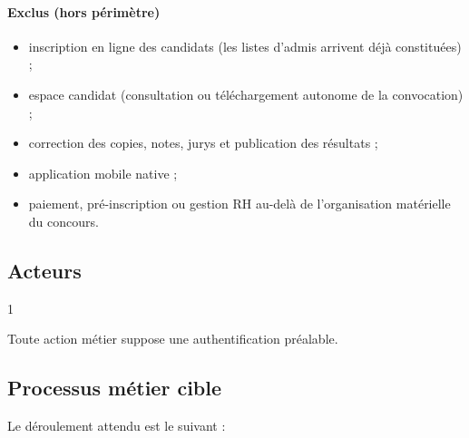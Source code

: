 \begin{onehalfspace}
\paragraph{Exclus (hors périmètre)}

\begin{itemize}
  \item inscription en ligne des candidats (les listes d'admis arrivent déjà constituées) ;
  \item espace candidat (consultation ou téléchargement autonome de la convocation) ;
  \item correction des copies, notes, jurys et publication des résultats ;
  \item application mobile native ;
  \item paiement, pré-inscription ou gestion RH au-delà de l'organisation matérielle du concours.
\end{itemize}

\subsection{Acteurs}

\begin{table}[H]
\centering
\caption{Acteurs du système}
\label{tab:acteurs}
\begin{spacing}{1}
\end{spacing}
\end{table}

Toute action métier suppose une authentification préalable.

\subsection{Processus métier cible}

Le déroulement attendu est le suivant :


\end{onehalfspace}
